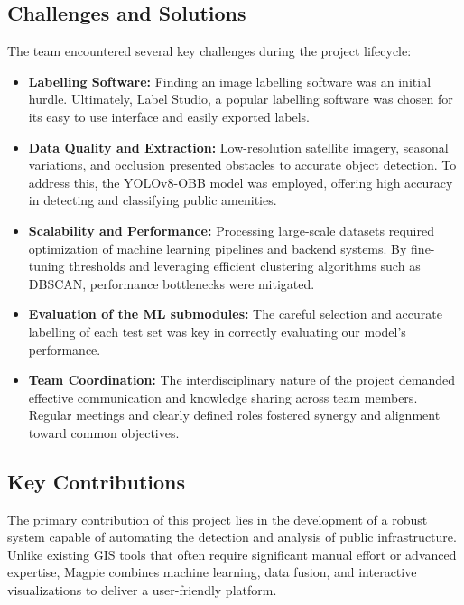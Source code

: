 \subsection{Challenges and Solutions}
The team encountered several key challenges during the project lifecycle:
\begin{itemize}
    \item \textbf{Labelling Software:} Finding an image labelling software was
          an initial hurdle. Ultimately, Label Studio, a popular labelling software
          was chosen for its easy to use interface and easily exported labels.
          \vspace{0.2cm}
          
    \item \textbf{Data Quality and Extraction:} Low-resolution satellite
          imagery, seasonal variations, and occlusion presented obstacles to accurate
          object detection. To address this, the YOLOv8-OBB model was employed,
          offering high accuracy in detecting and classifying public amenities.
          \vspace{0.2cm}
          
    \item \textbf{Scalability and Performance:} Processing large-scale datasets
          required optimization of machine learning pipelines and backend systems. By
          fine-tuning thresholds and leveraging efficient clustering algorithms such
          as DBSCAN, performance bottlenecks were mitigated.
          \vspace{0.2cm}
          
    \item \textbf{Evaluation of the ML submodules:} The careful selection and
          accurate labelling of each test set was key in correctly evaluating our
          model's performance.
          \vspace{0.2cm}
          
    \item \textbf{Team Coordination:} The interdisciplinary nature of the
          project demanded effective communication and knowledge sharing across team
          members. Regular meetings and clearly defined roles fostered synergy and
          alignment toward common objectives.
\end{itemize}

\newpage{}

\subsection{Key Contributions}
The primary contribution of this project lies in the development of a robust
system capable of automating the detection and analysis of public
infrastructure. Unlike existing GIS tools that often require significant manual
effort or advanced expertise, Magpie combines machine learning, data fusion, and
interactive visualizations to deliver a user-friendly platform.

